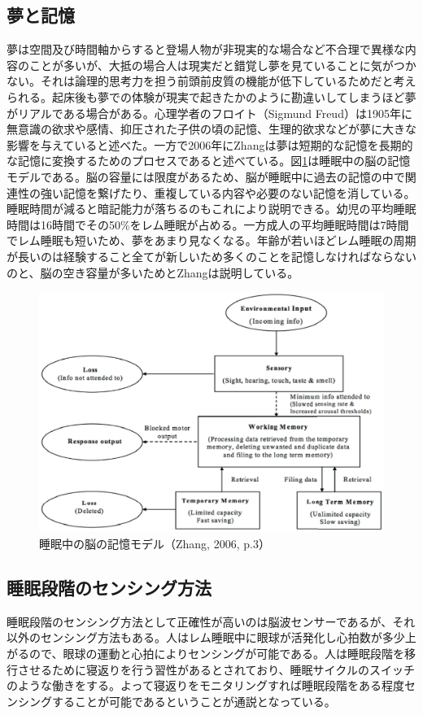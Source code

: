 \subsection{夢と記憶}
夢は空間及び時間軸からすると登場人物が非現実的な場合など不合理で異様な内容のことが多いが、大抵の場合人は現実だと錯覚し夢を見ていることに気がつかない。それは論理的思考力を担う前頭前皮質の機能が低下しているためだと考えられる\cite{cortex}。起床後も夢での体験が現実で起きたかのように勘違いしてしまうほど夢がリアルである場合がある。心理学者のフロイト（Sigmund Freud）は1905年に無意識の欲求や感情、抑圧された子供の頃の記憶、生理的欲求などが夢に大きな影響を与えていると述べた\cite{freud}。一方で2006年にZhangは夢は短期的な記憶を長期的な記憶に変換するためのプロセスであると述べている。図\ref{brainZhang}は睡眠中の脳の記憶モデルである\cite{Zhang}。脳の容量には限度があるため、脳が睡眠中に過去の記憶の中で関連性の強い記憶を繋げたり、重複している内容や必要のない記憶を消している\cite{Zhang}。睡眠時間が減ると暗記能力が落ちるのもこれにより説明できる。幼児の平均睡眠時間は16時間でその50\%をレム睡眠が占める。一方成人の平均睡眠時間は7時間でレム睡眠も短いため、夢をあまり見なくなる。年齢が若いほどレム睡眠の周期が長いのは経験すること全てが新しいため多くのことを記憶しなければならないのと、脳の空き容量が多いためとZhangは説明している\cite{Zhang}。

\begin{figure}[htbp]
\begin{center}
\includegraphics[width=13cm]{eps/sleepBrainModel.eps}
\caption{睡眠中の脳の記憶モデル（Zhang, 2006, p.3）}
\label{brainZhang}
\end{center}
\end{figure}

\subsection{睡眠段階のセンシング方法}
睡眠段階のセンシング方法として正確性が高いのは脳波センサーである\cite{hypnogram}が、それ以外のセンシング方法もある。人はレム睡眠中に眼球が活発化し心拍数が多少上がるので、眼球の運動と心拍によりセンシングが可能である。人は睡眠段階を移行させるために寝返りを行う習性があるとされており、睡眠サイクルのスイッチのような働きをする\cite{negaeri}。よって寝返りをモニタリングすれば睡眠段階をある程度センシングすることが可能であるということが通説となっている。

